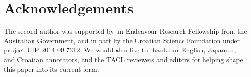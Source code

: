 \documentclass[11pt,letterpaper]{article}
\begin{document}
\section*{Acknowledgements}

The second author was supported by an Endeavour Research Fellowship
from the Australian Government, and in part by the Croatian Science
Foundation under project UIP-2014-09-7312. We would also like to thank
our English, Japanese, and Croatian annotators, and the TACL reviewers and editors for helping shape this paper into its current form.



\end{document}
